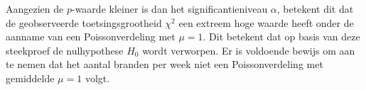 {    Aangezien de $p$-waarde kleiner is dan het significantieniveau $\alpha$, betekent dit dat de geobserveerde toetsingsgrootheid $\chi^2$ een extreem hoge waarde heeft onder de aanname van een Poissonverdeling met $\mu=1$.
    Dit betekent dat op basis van deze steekproef de nulhypothese $H_0$ wordt verworpen.
    Er is voldoende bewijs om aan te nemen dat het aantal branden per week niet een Poissonverdeling met gemiddelde $\mu=1$ volgt.

    \begin{center}
    \end{center}

}
